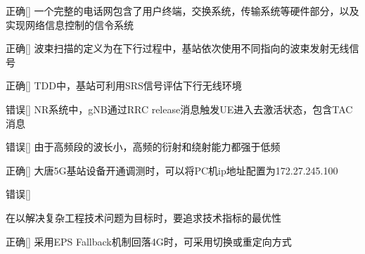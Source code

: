 \begin{choice}{\;正确\;}[]
    一个完整的电话网包含了用户终端，交换系统，传输系统等硬件部分，以及实现网络信息控制的信令系统
\end{choice}

\begin{choice}{\;正确\;}[]
    波束扫描的定义为在下行过程中，基站依次使用不同指向的波束发射无线信号
\end{choice}

\begin{choice}{\;正确\;}[]
    TDD中，基站可利用SRS信号评估下行无线环境
\end{choice}

\begin{choice}{\;错误\;}[]
    NR系统中，gNB通过RRC release消息触发UE进入去激活状态，包含TAC消息

\end{choice}


\begin{choice}{\;错误\;}[]
    由于高频段的波长小，高频的衍射和绕射能力都强于低频

\end{choice}

\begin{choice}{\;正确\;}[]
    大唐5G基站设备开通调测时，可以将PC机ip地址配置为172.27.245.100

\end{choice}

\begin{choice}{\;错误\;}[]

    在以解决复杂工程技术问题为目标时，要追求技术指标的最优性
\end{choice}


\begin{choice}{\;正确\;}[]
    采用EPS Fallback机制回落4G时，可采用切换或重定向方式

\end{choice}











